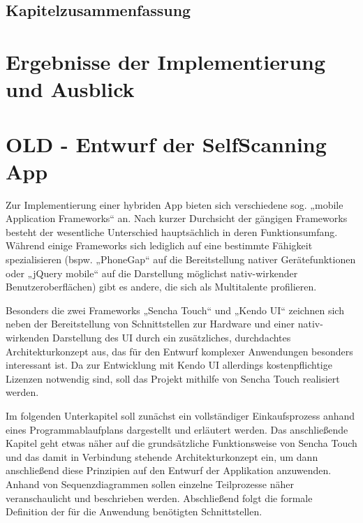 \section{Kapitelzusammenfassung}


\chapter{Ergebnisse der Implementierung und Ausblick}



\chapter{OLD - Entwurf der SelfScanning App}
Zur Implementierung einer hybriden App bieten sich verschiedene sog. „mobile Application Frameworks“ an. Nach kurzer Durchsicht der gängigen Frameworks besteht der wesentliche Unterschied hauptsächlich in deren Funktionsumfang. Während einige Frameworks sich lediglich auf eine bestimmte Fähigkeit spezialisieren (bspw. „PhoneGap“ auf die Bereitstellung nativer Gerätefunktionen oder „jQuery mobile“ auf die Darstellung möglichst nativ-wirkender Benutzeroberflächen) gibt es andere, die sich als Multitalente profilieren. 

Besonders die zwei Frameworks „Sencha Touch“ und „Kendo UI“ zeichnen sich neben der Bereitstellung von Schnittstellen zur Hardware und einer nativ-wirkenden Darstellung des UI durch ein zusätzliches, durchdachtes Architekturkonzept aus, das für den Entwurf komplexer Anwendungen besonders interessant ist. Da zur Entwicklung mit Kendo UI allerdings kostenpflichtige Lizenzen notwendig sind, soll das Projekt mithilfe von Sencha Touch realisiert werden.

Im folgenden Unterkapitel soll zunächst ein vollständiger Einkaufsprozess anhand eines Programmablaufplans dargestellt und erläutert werden. Das anschließende Kapitel geht etwas näher auf die grundsätzliche Funktionsweise von Sencha Touch und das damit in Verbindung stehende Architekturkonzept ein, um dann anschließend diese Prinzipien auf den Entwurf der Applikation anzuwenden. Anhand von Sequenzdiagrammen sollen einzelne Teilprozesse näher veranschaulicht und beschrieben werden. Abschließend folgt die formale Definition der für die Anwendung benötigten Schnittstellen.


% 
%
\seAppendix{}

